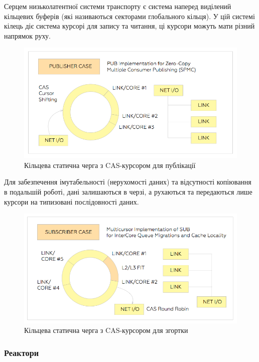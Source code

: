 \begin{definition}
\begin{definition}
\begin{definition}
\begin{definition}
Серцем низьколатентної системи транспорту є система наперед виділений
кільцевих буферів (які називаються секторами глобального кільця). У цій
системі кілець діє система курсорі для запису та читання, ці курсори
можуть мати різний напрямок руху.

\begin{figure}[h]
  \centerline{\includegraphics[scale=0.28]{pub}}
  \caption{Кільцева статична черга з CAS-курсором для публікації}
\end{figure}

Для забезпечення імутабельності (нерухомості даних) та відсутності
копіювання в подальшій роботі, дані залишаються в черзі, а рухаються та передаються
лише курсори на типизовані послідовності даних.

\begin{figure}[h]
  \centerline{\includegraphics[scale=0.28]{sub}}
  \caption{Кільцева статична черга з CAS-курсором для згортки}
\end{figure}

\newpage
\subsubsection{Реактори}


\end{definition}
\end{definition}
\end{definition}
\end{definition}
